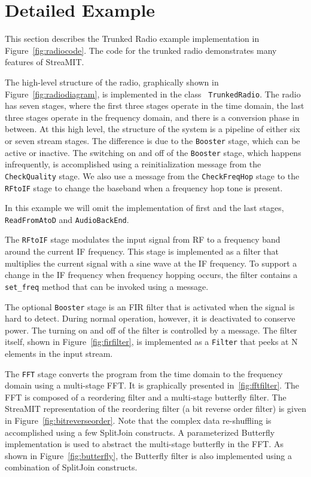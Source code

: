 \section{Detailed Example}
\label{sec:example}
This section describes the Trunked Radio example implementation in
Figure~\ref{fig:radiocode}. The code for the trunked radio
demonstrates many features of StreaMIT.

The high-level structure of the radio, graphically shown in
Figure~\ref{fig:radiodiagram}, is implemented in the class {\tt
TrunkedRadio}. The radio has seven stages, where the first three
stages operate in the time domain, the last three stages operate in
the frequency domain, and there is a conversion phase in between.  At
this high level, the structure of the system is a pipeline of either
six or seven stream stages. The difference is due to the {\tt Booster}
stage, which can be active or inactive. The switching on and off of
the {\tt Booster} stage, which happens infrequently, is accomplished
using a reinitialization message from the {\tt CheckQuality} stage. We
also use a message from the {\tt CheckFreqHop} stage to the {\tt
RFtoIF} stage to change the baseband when a frequency hop tone is
present.

In this example we will omit the implementation of first and the last
stages, {\tt ReadFromAtoD} and {\tt AudioBackEnd}.

The {\tt RFtoIF} stage modulates the input signal from RF to a
frequency band around the current IF frequency. This stage is
implemented as a filter that multiplies the current signal with a sine
wave at the IF frequency.  To support a change in the IF frequency
when frequency hopping occurs, the filter contains a {\tt set\_freq}
method that can be invoked using a message.

The optional {\tt Booster} stage is an FIR filter that is activated
when the signal is hard to detect. During normal operation, however,
it is deactivated to conserve power. The turning on and off of the
filter is controlled by a message.  The filter itself, shown in
Figure~\ref{fig:firfilter}, is implemented as a {\tt Filter} that
peeks at N elements in the input stream.

The {\tt FFT} stage converts the program from the time domain to the
frequency domain using a multi-stage FFT. It is graphically presented
in~\ref{fig:fftfilter}. The FFT is composed of a reordering filter and
a multi-stage butterfly filter. The StreaMIT representation of the
reordering filter (a bit reverse order filter) is given in
Figure~\ref{fig:bitreverseorder}. Note that the complex data
re-shuffling is accomplished using a few SplitJoin constructs.  A
parameterized Butterfly implementation is used to abstract the
multi-stage butterfly in the FFT. As shown in
Figure~\ref{fig:butterfly}, the Butterfly filter is also implemented
using a combination of SplitJoin constructs.

